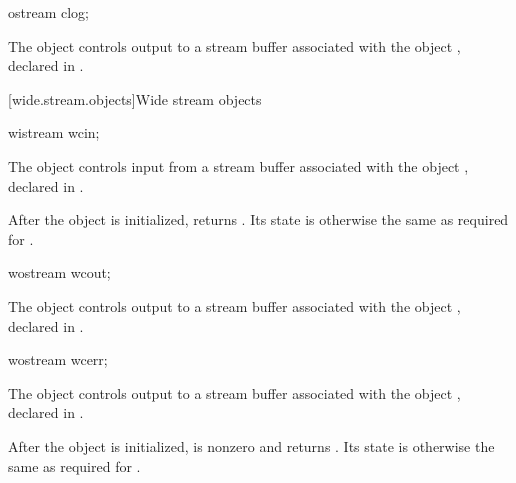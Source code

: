 %
\begin{itemdecl}
ostream clog;
\end{itemdecl}

\begin{itemdescr}
\pnum
The object 
controls output to a stream buffer
associated with the object ,
declared in .
\end{itemdescr}

[wide.stream.objects]{Wide stream objects}

%
\begin{itemdecl}
wistream wcin;
\end{itemdecl}

\begin{itemdescr}
\pnum
The object 
controls input from a stream buffer associated with the object ,
declared in .

\pnum
After the object
is initialized,
returns
.
Its state is otherwise the same as required for
.
\end{itemdescr}

%
\begin{itemdecl}
wostream wcout;
\end{itemdecl}

\begin{itemdescr}
\pnum
The object 
controls output to a stream buffer associated with the object ,
declared in .
\end{itemdescr}

%
\begin{itemdecl}
wostream wcerr;
\end{itemdecl}

\begin{itemdescr}
\pnum
The object 
controls output to a stream buffer associated with the object ,
declared in .

\pnum
After the object
is initialized,
is nonzero and  returns .
Its state is otherwise the same as required for
.
\end{itemdescr}

